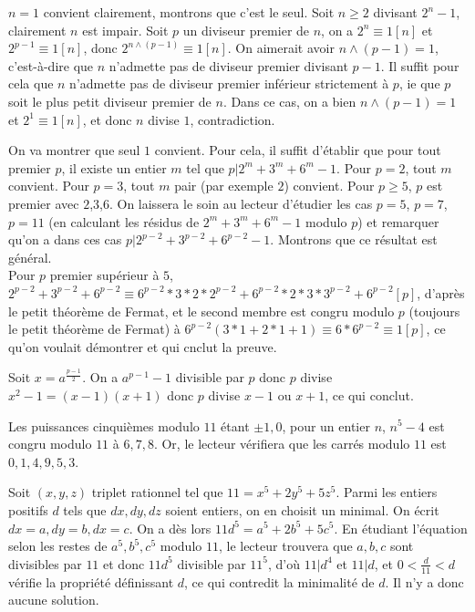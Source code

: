 \begin{sol}[17]
		$n=1$ convient clairement, montrons que c'est le seul. Soit $n \geq 2$ divisant $2^n-1$, clairement $n$ est impair. Soit $p$ un diviseur premier de $n$, on a $2^n \equiv 1 [n]$ et $2^{p-1} \equiv 1 [n]$, donc $2^{n \wedge (p-1)} \equiv 1 [n]$. On aimerait avoir $n \wedge (p-1)=1$, c'est-\`a-dire que $n$ n'admette pas de diviseur premier divisant $p-1$. Il suffit pour cela que $n$ n'admette pas de diviseur premier inf\'erieur strictement \`a $p$, ie que $p$ soit le plus petit diviseur premier de $n$. Dans ce cas, on a bien $n \wedge (p-1)=1$ et $2^1 \equiv 1 [n]$, et donc $n$ divise $1$, contradiction. 
\end{sol}

\begin{sol}[18]
		On va montrer que seul $1$ convient. Pour cela, il suffit d'\'etablir que pour tout premier $p$, il existe un entier $m$ tel que $p | 2^m+3^m+6^m-1$. Pour $p=2$, tout $m$ convient. Pour $p=3$, tout $m$ pair (par exemple $2$) convient. Pour $p \geq 5$, $p$ est premier avec $2$,$3$,$6$. On laissera le soin au lecteur d'\'etudier les cas $p=5$, $p=7$, $p=11$ (en calculant les r\'esidus de $2^m+3^m+6^m-1$ modulo $p$) et remarquer qu'on a dans ces cas $p|2^{p-2}+3^{p-2}+6^{p-2}-1$. Montrons que ce r\'esultat est g\'en\'eral. \\
		Pour $p$ premier sup\'erieur \`a $5$, $2^{p-2}+3^{p-2}+6^{p-2} \equiv 6^{p-2}*3*2*2^{p-2}+6^{p-2}*2*3*3^{p-2} + 6^{p-2} [p]$, d'apr\`es le petit th\'eor\`eme de Fermat, et le second membre est congru modulo $p$ (toujours le petit th\'eor\`eme de Fermat) \`a $6^{p-2}(3*1+2*1+1) \equiv 6*6^{p-2} \equiv 1 [p]$, ce qu'on voulait d\'emontrer et qui cnclut la preuve.
\end{sol}

\begin{sol}[19]
		Soit $x=a^{\frac{p-1}{2}}$. On a $a^{p-1}-1$ divisible par $p$ donc $p$ divise $x^2-1=(x-1)(x+1)$ donc $p$ divise $x-1$ ou $x+1$, ce qui conclut. 
\end{sol}

\begin{sol}[20]
		Les puissances cinqui\`emes modulo $11$ \'etant $\pm 1,0$, pour un entier $n$, $n^5-4$ est congru modulo $11$ \`a $6,7,8$. Or, le lecteur v\'erifiera que les carr\'es modulo $11$ est $0,1,4,9,5,3$. 
\end{sol}

\begin{sol}[21]
		Soit $(x,y,z)$ triplet rationnel tel que $11=x^5+2y^5+5z^5$. Parmi les entiers positifs $d$ tels que $dx,dy,dz$ soient entiers, on en choisit un minimal. On \'ecrit $dx=a,dy=b,dx=c$. On a d\`es lors $11d^5=a^5+2b^5+5c^5$. En \'etudiant l'\'equation selon les restes de $a^5,b^5,c^5$ modulo $11$, le lecteur trouvera que $a,b,c$ sont divisibles par $11$ et donc $11d^5$ divisible par $11^5$, d'o\`u $11|d^4$ et $11|d$, et $0 < \frac{d}{11} < d$ v\'erifie la propri\'et\'e d\'efinissant $d$, ce qui contredit la minimalit\'e de $d$. Il n'y a donc aucune solution.
\end{sol}

